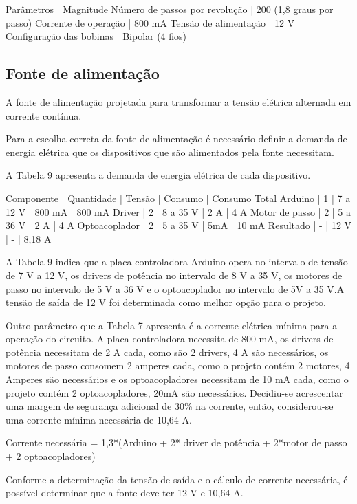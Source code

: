 Parâmetros | Magnitude
Número de passos por revolução | 200 (1,8 graus por passo)
Corrente de operação | 800 mA
Tensão de alimentação | 12 V
Configuração das bobinas | Bipolar (4 fios)

\subsection{Fonte de alimentação}

A fonte de alimentação projetada para transformar a tensão elétrica alternada em corrente contínua.

Para a escolha correta da fonte de alimentação é necessário definir a demanda de energia elétrica 
que os dispositivos que são alimentados pela fonte necessitam.

A Tabela 9 apresenta a demanda de energia elétrica de cada dispositivo.


Componente | Quantidade | Tensão | Consumo | Consumo Total
Arduino | 1 | 7 a 12 V | 800 mA | 800 mA
Driver | 2 | 8 a 35 V | 2 A | 4 A
Motor de passo | 2 | 5 a 36 V | 2 A | 4 A
Optoacoplador | 2 | 5 a 35 V | 5mA | 10 mA
Resultado | - | 12 V | - | 8,18 A

A Tabela 9 indica que a placa controladora Arduino opera no intervalo de tensão de 7 V a 12 V, 
os drivers de potência no intervalo de 8 V a 35 V, os motores de passo no intervalo de 5 V a 36 V 
e o optoacoplador no intervalo de 5V a 35 V.A tensão de saída de 12 V foi determinada como melhor 
opção para o projeto.

Outro parâmetro que a Tabela 7 apresenta é a corrente elétrica mínima para a operação do circuito. 
A placa controladora necessita de 800 mA, os drivers de potência necessitam de 2 A cada, como são 2 drivers, 
4 A são necessários, os motores de passo consomem 2 amperes cada, como o projeto contém 2 motores, 4 Amperes 
são necessários e os optoacopladores necessitam de 10 mA cada, como o projeto contém 2 optoacopladores, 
20mA são necessários. Decidiu-se acrescentar uma margem de segurança adicional de 30\% na corrente, 
então, considerou-se uma corrente mínima necessária de 10,64 A.

Corrente necessária = 1,3*(Arduino + 2* driver de potência + 2*motor de passo + 2 optoacopladores)

Conforme a determinação da tensão de saída e o cálculo de corrente necessária, 
é possível determinar que a fonte deve ter 12 V e 10,64 A.

